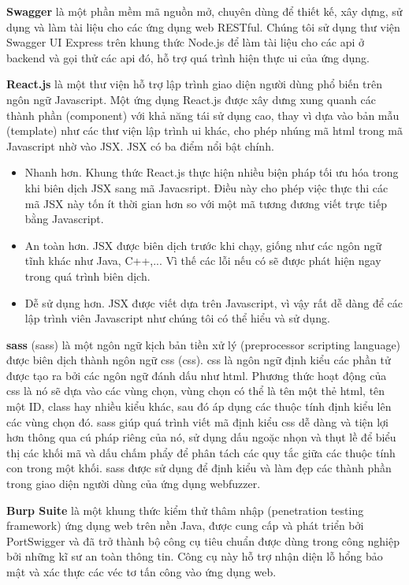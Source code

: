 \textbf{Swagger} là một phần mềm mã nguồn mở, chuyên dùng để thiết kế, xây dựng, sử dụng và làm tài liệu cho các ứng dụng web RESTful. Chúng tôi sử dụng thư viện Swagger UI Express \parencite{swagger-ui-express-npm} trên khung thức Node.js để làm tài liệu cho các \acrshort{api} ở backend và gọi thử các \acrshort{api} đó, hỗ trợ quá trình hiện thực \acrshort{ui} của ứng dụng.\par
\textbf{React.js} là một thư viện hỗ trợ lập trình giao diện người dùng phổ biến trên ngôn ngữ Javascript. Một ứng dụng React.js được xây dưng xung quanh các thành phần (component) với khả năng tái sử dụng cao, thay vì dựa vào bản mẫu (template) như các thư viện lập trình \acrshort{ui} khác, cho phép nhúng mã \acrshort{html} trong mã Javascript nhờ vào JSX. JSX có ba điểm nổi bật chính.
\begin{itemize}
    \item Nhanh hơn. Khung thức React.js thực hiện nhiều biện pháp tối ưu hóa trong khi biên dịch JSX sang mã Javacsript. Điều này cho phép việc thực thi các mã JSX này tốn ít thời gian hơn so với một mã tương đương viết trực tiếp bằng Javascript.
    \item An toàn hơn. JSX được biên dịch trước khi chạy, giống như các ngôn ngữ tĩnh khác như Java, C++,... Vì thế các lỗi nếu có sẽ được phát hiện ngay trong quá trình biên dịch.
    \item Dễ sử dụng hơn. JSX được viết dựa trên Javascript, vì vậy rất dễ dàng để các lập trình viên Javascript như chúng tôi có thể hiểu và sử dụng.
\end{itemize}
\textbf{\acrshort{sass}} (\acrlong{sass}) là một ngôn ngữ kịch bản tiền xử lý (preprocessor scripting language) được biên dịch thành ngôn ngữ \acrshort{css} (\acrlong{css}). \acrshort{css} là ngôn ngữ định kiểu các phần tử được tạo ra bởi các ngôn ngữ đánh dấu như \acrshort{html}. Phương thức hoạt động của \acrshort{css} là nó sẽ dựa vào các vùng chọn, vùng chọn có thể là tên một thẻ \acrshort{html}, tên một ID, class hay nhiều kiểu khác, sau đó áp dụng các thuộc tính định kiểu lên các vùng chọn đó. \acrshort{sass} giúp quá trình viết mã định kiểu \acrshort{css} dễ dàng và tiện lợi hơn thông qua cú pháp riêng của nó, sử dụng dấu ngoặc nhọn và thụt lề để biểu thị các khối mã và dấu chấm phẩy để phân tách các quy tắc giữa các thuộc tính con trong một khối. \acrshort{sass} được sử dụng để định kiểu và làm đẹp các thành phần trong giao diện người dùng của ứng dụng webfuzzer.\par
\textbf{Burp Suite} \parencite{burpsuite} là một khung thức kiểm thử thâm nhập (penetration testing framework) ứng dụng web trên nền Java, được cung cấp và phát triển bởi PortSwigger và đã trở thành bộ công cụ tiêu chuẩn được dùng trong công nghiệp bởi những kĩ sư an toàn thông tin. Công cụ này hỗ trợ nhận diện lỗ hổng bảo mật và xác thực các véc tơ tấn công vào ứng dụng web.
